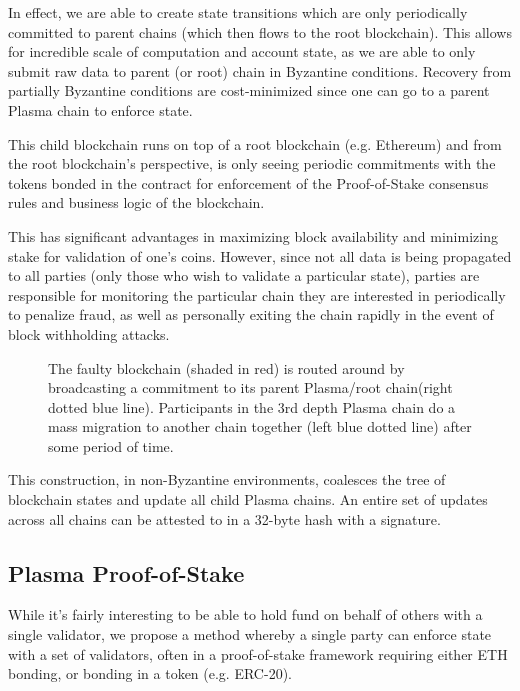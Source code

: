 \documentclass[letterpaper, 11pt]{article}
\begin{document}
In effect, we are able to create state transitions which are only periodically
committed to parent chains (which then flows to the root blockchain). This
allows for incredible scale of computation and account state, as we are able to
only submit raw data to parent (or root) chain in Byzantine conditions. Recovery
from partially Byzantine conditions are cost-minimized since one can go to a
parent Plasma chain to enforce state.

This child blockchain runs on top of a root blockchain (e.g. Ethereum) and from
the root blockchain's perspective, is only seeing periodic commitments with the
tokens bonded in the contract for enforcement of the Proof-of-Stake consensus
rules and business logic of the blockchain.

This has significant advantages in maximizing block availability and minimizing
stake for validation of one's coins. However, since not all data is being
propagated to all parties (only those who wish to validate a particular state),
parties are responsible for monitoring the particular chain they are interested
in periodically to penalize fraud, as well as personally exiting the chain
rapidly in the event of block withholding attacks.

\begin{figure}[H]
	\caption{
		The faulty blockchain (shaded in red) is routed around by
		broadcasting a commitment to its parent Plasma/root chain(right
		dotted blue line). Participants in the 3rd depth Plasma chain
		do a mass migration to another chain together (left blue dotted
		line) after some period of time.
		}
\end{figure}

This construction, in non-Byzantine environments, coalesces the tree of
blockchain states and update all child Plasma chains. An entire set of updates
across all chains can be attested to in a 32-byte hash with a signature.

\subsection{Plasma Proof-of-Stake}

While it's fairly interesting to be able to hold fund on behalf of others with a
single validator, we propose a method whereby a single party can enforce state
with a set of validators, often in a proof-of-stake framework requiring either
ETH bonding, or bonding in a token (e.g. ERC-20).
\end{document}
